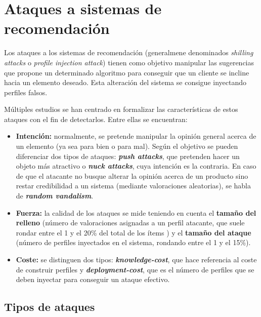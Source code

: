 \section{Ataques a sistemas de recomendación}

Los ataques a los sistemas de recomendación (generalmene denominados \textit{shilling attacks} o \textit{profile injection attack}) tienen como objetivo manipular las sugerencias que propone un determinado algoritmo para conseguir que un cliente se incline hacia un elemento deseado. Esta alteración del sistema se consigue inyectando perfiles falsos.

Múltiples estudios se han centrado en formalizar las características de estos ataques con el fin de detectarlos. Entre ellas se encuentran:

\begin{itemize}
	
	\item \textbf{Intención:} normalmente, se pretende manipular la opinión general acerca de un elemento (ya sea para bien o para mal). Según el objetivo se pueden diferenciar dos tipos de ataques: \textbf{\textit{push attacks}}, que pretenden hacer un objeto más atractivo o \textbf{\textit{nuck attacks}}, cuya intención es la contraria. En caso de que el atacante no busque alterar la opinión acerca de un producto sino restar credibilidad a un sistema (mediante valoraciones aleatorias), se habla de \textbf{\textit{random vandalism}}.
	
	\item \textbf{Fuerza:} la calidad de los ataques se mide teniendo en cuenta el \textbf{tamaño del relleno} (número de valoraciones asignadas a un perfil atacante, que suele rondar entre el 1 y el 20\% del total de los ítems \cite{mingdan2020ShillingAttacksAReview}) y el \textbf{tamaño del ataque} (número de perfiles inyectados en el sistema, rondando entre el 1 y el 15\%).
	
	\item \textbf{Coste:} se distinguen dos tipos: \textbf{\textit{knowledge-cost}}, que hace referencia al coste de construir perfiles y \textbf{\textit{deployment-cost}}, que es el número de perfiles que se deben inyectar para conseguir un ataque efectivo.
	
\end{itemize}
		
\subsection{Tipos de ataques}

